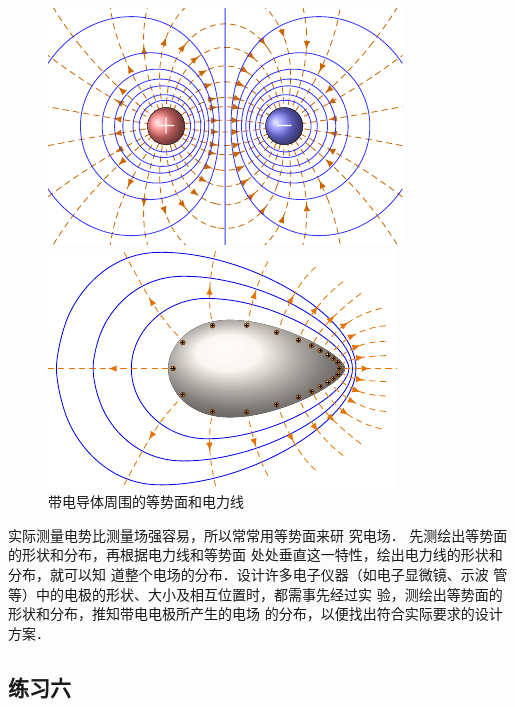 \begin{figure}[htbp]
	\centering
	\begin{minipage}[t]{0.46\textwidth}
		\centering
		\includegraphics{fig/B/6-21.pdf}
		\caption{}\label{fig_B_6-21}
	\end{minipage}
	\begin{minipage}[t]{0.5\textwidth}
		\centering
		\includegraphics[scale=1.1]{fig/B/6-22.pdf}
		\caption{带电导体周围的等势面和电力线}\label{fig_B_6-22}
	\end{minipage}
\end{figure}



实际测量电势比测量场强容易，所以常常用等势面来研
究电场．
先测绘出等势面的形状和分布，再根据电力线和等势面
处处垂直这一特性，绘出电力线的形状和分布，就可以知
道整个电场的分布．设计许多电子仪器（如电子显微镜、示波
管等）中的电极的形状、大小及相互位置时，都需事先经过实
验，测绘出等势面的形状和分布，推知带电电极所产生的电场
的分布，以便找出符合实际要求的设计方案．


\subsection*{练习六}

